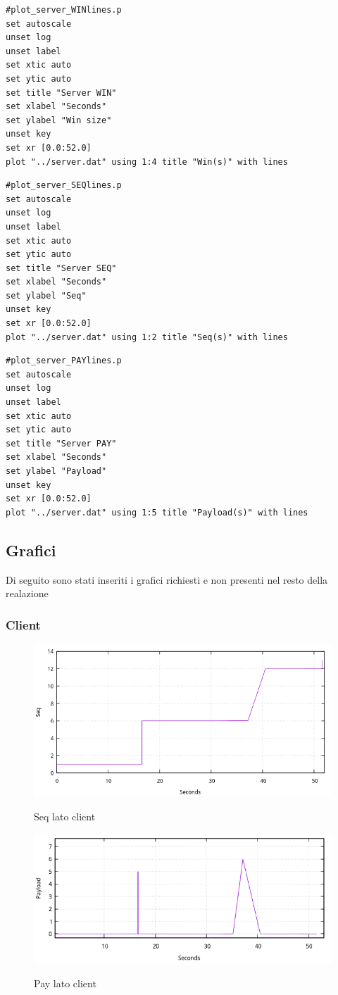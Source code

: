 \documentclass[12pt]{article}
\begin{document}
\newpage

\begin{lstlisting}
#plot_server_WINlines.p
set autoscale
unset log
unset label
set xtic auto
set ytic auto
set title "Server WIN"
set xlabel "Seconds"
set ylabel "Win size"
unset key
set xr [0.0:52.0]
plot "../server.dat" using 1:4 title "Win(s)" with lines
\end{lstlisting}

\begin{lstlisting}
#plot_server_SEQlines.p
set autoscale
unset log
unset label
set xtic auto
set ytic auto
set title "Server SEQ"
set xlabel "Seconds"
set ylabel "Seq"
unset key
set xr [0.0:52.0]
plot "../server.dat" using 1:2 title "Seq(s)" with lines
\end{lstlisting}


\begin{lstlisting}
#plot_server_PAYlines.p
set autoscale
unset log
unset label
set xtic auto
set ytic auto
set title "Server PAY"
set xlabel "Seconds"
set ylabel "Payload"
unset key
set xr [0.0:52.0]
plot "../server.dat" using 1:5 title "Payload(s)" with lines
\end{lstlisting}

\newpage
\subsection{Grafici}
Di seguito sono stati inseriti i grafici richiesti e non presenti nel resto della realazione
\subsubsection{Client}
\begin{figure}[H]
	\center
	\includegraphics[width=0.75\linewidth]{client_seq_lines.png}
	\label{eth}
	\caption{Seq lato client}
\end{figure}

\begin{figure}[H]
	\center
	\includegraphics[width=0.75\linewidth]{client_pay_lines.png}
	\label{eth}
	\caption{Pay lato client}
\end{figure}
\end{document}
